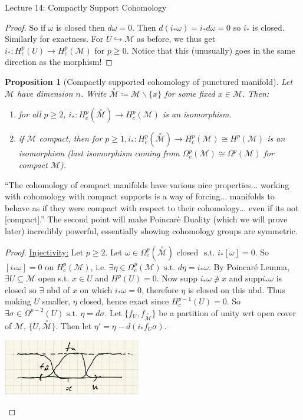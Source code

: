 \documentclass[10pt]{article}
\theoremstyle{plain}
\newtheorem{prop}[thm]{Proposition}
\theoremstyle{definition}
\newcommand{\st}{\text{ s.t. }}
\newcommand{\man}{\mathcal{M}}
\newcommand{\xman}{x\in\man}
\newcommand{\pformman}[1]{\Omega^{#1}(\man)}
\newcommand{\compactpformman}[1]{\Omega^{#1}_c(\man)}
\newcommand{\deriv}{d}
\newcommand{\dw}{d\omega}
\newcommand{\deta}{\deriv\eta}
\newcommand{\cohomman}[1]{H^{#1}(\man)}
\newcommand{\compactcohomman}[1]{H_c^{#1}(\man)}
\newcommand{\puncman}{\overset{\circ}{\man}}
\begin{document}
\begin{section}{Lecture 14: Compactly Support Cohomology}
\begin{proof}
So if $\omega$ is closed then $\dw = 0.$ Then $d(i_*\omega) = i_* \dw = 0$ so $i_*$ is closed. Similarly for exactness. For $U \hookrightarrow \man $ as before, we thus get $i_* : H^p_c(U) \to H^p_c(\man)$ for $p \geq 0$. Notice that this (unusually) goes in the same direction as the morphism!
\end{proof}
\begin{prop}[Compactly supported cohomology of punctured manifold]
Let $\man $ have dimension $n$. Write $\puncman \coloneqq \man \backslash \{x\}$ for some fixed $\xman$. Then:\begin{enumerate}
    \item for all $p \geq 2$, $i_* : H^p_c(\puncman) \to \compactcohomman{p}$ is an isomorphism.
    \item if $\man$ compact, then for $p\geq 1, i_* : H_c^p(\puncman) \to \compactcohomman{p} \cong\cohomman{p}$ is an isomorphism (last isomorphism coming from $\compactpformman{p} \cong \pformman{p}$ for compact $\man$).
\end{enumerate}
\end{prop}
``The cohomology of compact manifolds have various nice properties... working with cohomology with compact supports is a way of forcing... manifolds to behave as if they were compact with respect to their cohomology... even if its not [compact].'' The second point will make Poincar\`e Duality (which we will prove later) incredibly powerful, essentially showing cohomology groups are symmetric.
\begin{proof}
\underline{Injectivity:} Let $p\geq 2$. Let $\omega \in \Omega_c^p(\puncman)$ closed $\st i_*[\omega] = 0.$ So $[i_* \omega] = 0$ on $\compactcohomman{p}$, i.e. $\exists \eta \in \compactpformman{p} \st \deta = i_* \omega.$ By Poincar\'e Lemma, $\exists U \subseteq \man$ open s.t. $x\in U$ and $H^p(U) = 0.$ Now supp $i_*\omega \not\ni x$ and supp$i_* \omega$ is closed so $\exists$ nbd of $x$ on which $i_*\omega = 0$, therefore $\eta$ is closed on this nbd. Thus making $U$ smaller, $\eta$ closed, hence exact since $H^{p-1}_c(U) = 0$. So $\exists \sigma  \in \Omega^{p-2}(U) \st \eta = \deriv \sigma$. Let $\{f_U, f_{\puncman}\}$ be a partition of unity wrt open cover of $\man$, $\{U,\puncman\}$. Then let $\eta' = \eta - \deriv(i_*f_U \sigma)$.
\begin{center}\includegraphics[width=0.45\textwidth]{PuncturedManifoldProposition.png}\end{center}

\end{proof}
\end{section}
\end{document}
